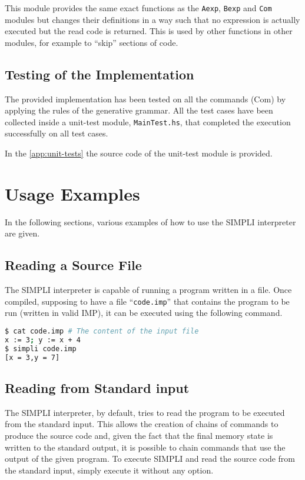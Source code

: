 \documentclass{esposito-documentation}
\begin{document}
This module provides the same exact functions as the \texttt{Aexp},
\texttt{Bexp} and \texttt{Com} modules but changes their definitions in a way
such that no expression is actually executed but the read code is returned.
This is used by other functions in other modules, for example to ``skip''
sections of code.



\section{Testing of the Implementation}

The provided implementation has been tested on all the commands
($\mathrm{Com}$) by applying the rules of the generative grammar. All the test
cases have been collected inside a unit-test module, \texttt{MainTest.hs}, that
completed the execution successfully on all test cases.

In the \autoref{app:unit-tests} the source code of the unit-test module is
provided.
\chapter{Usage Examples}

In the following sections, various examples of how to use the SIMPLI
interpreter are given.

\section{Reading a Source File}

The SIMPLI interpreter is capable of running a program written in a file. Once
compiled, supposing to have a file ``\texttt{code.imp}'' that contains the
program to be run (written in valid IMP), it can be executed using the
following command.

\begin{lstlisting}[language=sh,numbers=none]
$ cat code.imp # The content of the input file
x := 3; y := x + 4
$ simpli code.imp
[x = 3,y = 7]
\end{lstlisting}

\section{Reading from Standard input}

The SIMPLI interpreter, by default, tries to read the program to be executed
from the standard input. This allows the creation of chains of commands to
produce the source code and, given the fact that the final memory state is
written to the standard output, it is possible to chain commands that use the
output of the given program. To execute SIMPLI and read the source code from
the standard input, simply execute it without any option.
\end{document}
